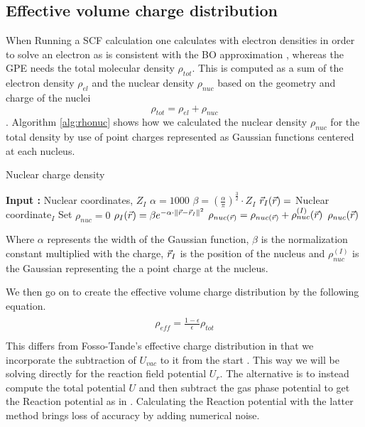 \documentclass[../master_thesis.tex]{subfiles}
\begin{document}
\subsection{Effective volume charge distribution}
When Running a \ac{SCF} calculation one calculates with electron densities in order
to solve an electron \SE as is consistent with the \ac{BO} approximation
\cite{Cramer:2004, Konishi:2009}, whereas the \ac{GPE} needs the total molecular
density $\rho_{tot}$. This is computed as a sum of the electron
density $\rho_{el}$ and the nuclear density $\rho_{nuc}$ based on the
geometry and charge of the nuclei
\begin{equation}
  \rho_{tot} = \rho_{el} + \rho_{nuc}
\end{equation}.
Algorithm \ref{alg:rhonuc} shows how we calculated the nuclear
density $\rho_{nuc}$ for the total density by use of point charges represented as
Gaussian functions centered at each nucleus.
\begin{algorithm}
  \caption{Nuclear charge density}\label{alg:rhonuc}
  \begin{algorithmic}
    \STATE \textbf{Input :} Nuclear coordinates, $Z_I$
    \STATE $\alpha = 1000$
    \STATE $\beta = (\frac{\alpha}{\pi})^{\frac{3}{2}} \cdot Z_I$
    \STATE $\vec{r}_I(\vec{r}) =$ Nuclear coordinate$_I$
    \STATE Set $\rho_{nuc} = 0$
    \STATE $\rho_{I}(\vec{r}) = \beta e^{-\alpha\cdot\lVert\vec{r} -\vec{r}_I\rVert^2}$
    \STATE $\rho_{nuc(\vec{r})} = \rho_{nuc(\vec{r})} + \rho_{nuc}^{(I)}(\vec{r})$
    \ENDFOR
    \RETURN $\rho_{nuc}(\vec{r})$
  \end{algorithmic}
\end{algorithm}

Where $\alpha$ represents the width of the Gaussian function, $\beta$ is the normalization
constant multiplied with the charge, $\vec{r}_I$ is the position of the nucleus and
$\rho_{nuc}^{(I)}$ is the Gaussian representing the a point charge at the nucleus.

We then go on to create the effective volume charge distribution by the following equation.
\begin{align}
    \begin{split}
      \rho_{eff} = \frac{1 - \epsilon}{\epsilon}\rho_{tot}\\
    \end{split}
\end{align}
This differs from Fosso-Tande's effective charge distribution in that we incorporate
the subtraction of $U_{vac}$ to it from the start \cite{FossoTande:2013ka}. This
way we will be solving directly for the reaction field potential $U_r$.
The alternative is to instead compute the total potential $U$ and then subtract
the gas phase potential to get the Reaction potential as in \cite{FossoTande:2013ka}.
Calculating the Reaction potential with the latter method brings loss of accuracy
by adding numerical noise.
\end{document}
